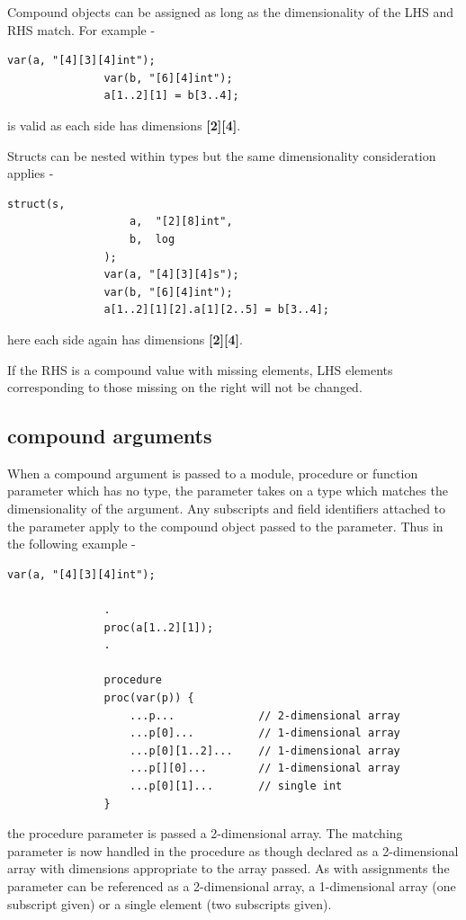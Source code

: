             Compound objects can be assigned as long as the dimensionality of the
            LHS and RHS match. For example -
            \begin{lstlisting}[gobble=12, language=threepl]
               var(a, "[4][3][4]int");
               var(b, "[6][4]int");
               a[1..2][1] = b[3..4];
            \end{lstlisting}
            is valid as each side has dimensions {\bf [2][4]}.

            Structs can be nested within types but the same dimensionality
            consideration applies -
            \begin{lstlisting}[gobble=12, language=threepl]
               struct(s,
                   a,  "[2][8]int",
                   b,  log
               );
               var(a, "[4][3][4]s");
               var(b, "[6][4]int");
               a[1..2][1][2].a[1][2..5] = b[3..4];
            \end{lstlisting}
            here each side again has dimensions {\bf [2][4]}.
            
            If the RHS is a compound value with missing elements, LHS
            elements corresponding to those missing on the right will
            not be changed.

        \subsection{compound arguments}\label{sec:compoundarg}

            When a compound argument is passed to a module, procedure or
            function parameter which has no type, the parameter takes
            on a type which matches the dimensionality of the argument.
            Any subscripts
            and field identifiers attached to the parameter apply to the
            compound object passed to the parameter. Thus in the
            following example -
            \begin{lstlisting}[gobble=12, language=threepl]
               var(a, "[4][3][4]int");

               .
               proc(a[1..2][1]);
               .

               procedure
               proc(var(p)) {
                   ...p...             // 2-dimensional array
                   ...p[0]...          // 1-dimensional array
                   ...p[0][1..2]...    // 1-dimensional array
                   ...p[][0]...        // 1-dimensional array
                   ...p[0][1]...       // single int
               }
            \end{lstlisting}
            the procedure parameter is passed a 2-dimensional array. The
            matching parameter is now handled in the procedure as though
            declared as a 2-dimensional array with dimensions appropriate to
            the array passed. As with assignments the parameter can be
            referenced as a 2-dimensional array, a 1-dimensional array (one
            subscript given) or a single element (two subscripts given).

